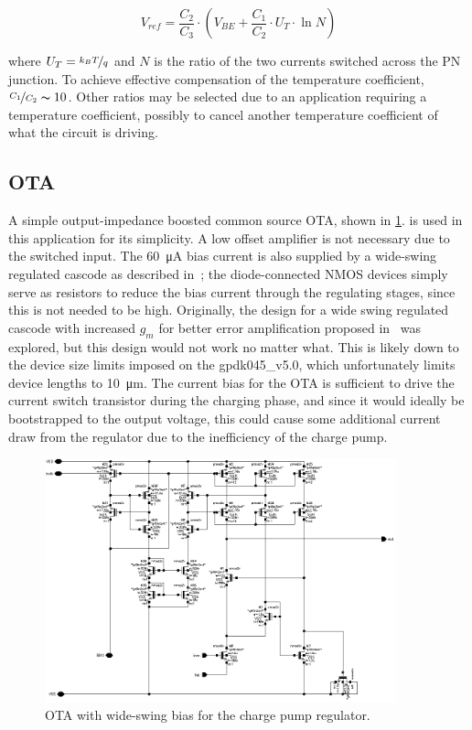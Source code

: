 \documentclass[11pt,letterpaper]{article}
\begin{document}
\begin{equation}
    V_{ref} = \frac{C_2}{C_3}\cdot \left( V_{BE} + \frac{C_1}{C_2}\cdot U_T\cdot \ln{N} \right)\label{eq:vref}
\end{equation}

where \(U_T = \nicefrac{k_B T}{q}\) and \(N\) is the ratio of the two currents switched across the PN junction. To achieve effective compensation of the temperature coefficient, \(\nicefrac{C_1}{C_2} \thicksim 10\). Other ratios may be selected due to an application requiring a temperature coefficient, possibly to cancel another temperature coefficient of what the circuit is driving.

\subsection{OTA}

A simple output-impedance boosted common source OTA, shown in \cref{fig:ota}. is used in this application for its simplicity. A low offset amplifier is not necessary due to the switched input. The \qty{60}{\uA} bias current is also supplied by a wide-swing regulated cascode as described in~\cite{Sackinger1990}; the diode-connected NMOS devices simply serve as resistors to reduce the bias current through the regulating stages, since this is not needed to be high. Originally, the design for a wide swing regulated cascode with increased \(g_m\) for better error amplification proposed in~\cite{Vajpayee2010} was explored, but this design would not work no matter what. This is likely down to the device size limits imposed on the gpdk045\_v5.0, which unfortunately limits device lengths to \qty{10}{\um}. The current bias for the OTA is sufficient to drive the current switch transistor during the charging phase, and since it would ideally be bootstrapped to the output voltage, this could cause some additional current draw from the regulator due to the inefficiency of the charge pump.

\begin{figure}[ht]
    \centering
    \includegraphics[width=4in]{images/cp_sch_ota.eps} 
    \caption{OTA with wide-swing bias for the charge pump regulator.}\label{fig:ota}
\end{figure}
\end{document}
